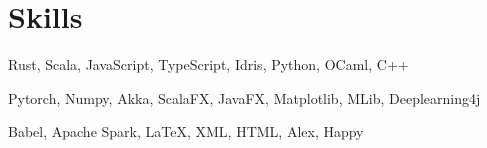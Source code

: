 \section{Skills}

%
{}%
{}%
{}%
{Rust, Scala, JavaScript, TypeScript, Idris, Python, OCaml, C++
\newline{}
}

%
{}%
{}%
{}%
{Pytorch, Numpy, Akka, ScalaFX, JavaFX, Matplotlib, MLib, Deeplearning4j
\newline{}
}

%
{}%
{}%
{}%
{Babel, Apache Spark, LaTeX, XML, HTML, Alex, Happy
\newline{}
}